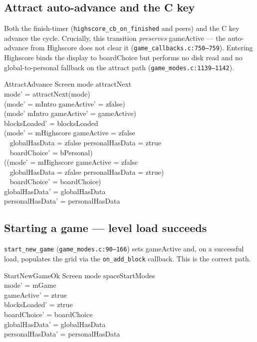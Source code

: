 \documentclass[a4paper,10pt,fleqn]{article}
\begin{document}
\subsection{Attract auto-advance and the C key}

Both the finish-timer (\texttt{highscore\_cb\_on\_finished} and peers)
and the C key advance the cycle.  Crucially, this transition
\emph{preserves} \textsf{gameActive} --- the auto-advance from
\textsf{Highscore} does not clear it (\texttt{game\_callbacks.c:750--759}).
Entering \textsf{Highscore} binds the display to \textsf{boardChoice}
but performs no disk read and no global-to-personal fallback on the
attract path (\texttt{game\_modes.c:1139--1142}).

\begin{schema}{AttractAdvance}
  \Delta Screen
  \where
  mode \in \dom attractNext \\
  mode' = attractNext(mode) \\
  (mode' = mIntro \implies gameActive' = zfalse) \\
  (mode' \neq mIntro \implies gameActive' = gameActive) \\
  blocksLoaded' = blocksLoaded \\
  (mode' = mHighscore \land gameActive = zfalse \\
    \quad~ \land globalHasData = zfalse \land personalHasData = ztrue \\
  \quad~ \implies boardChoice' = bPersonal) \\
  (\lnot (mode' = mHighscore \land gameActive = zfalse \\
    \quad~ \land globalHasData = zfalse \land personalHasData = ztrue) \\
  \quad~ \implies boardChoice' = boardChoice) \\
  globalHasData' = globalHasData \\
  personalHasData' = personalHasData
\end{schema}

\subsection{Starting a game --- level load succeeds}

\texttt{start\_new\_game} (\texttt{game\_modes.c:90--166}) sets
\textsf{gameActive} and, on a successful load, populates the grid via
the \texttt{on\_add\_block} callback.  This is the correct path.

\begin{schema}{StartNewGameOk}
  \Delta Screen
  \where
  mode \in spaceStartModes \\
  mode' = mGame \\
  gameActive' = ztrue \\
  blocksLoaded' = ztrue \\
  boardChoice' = boardChoice \\
  globalHasData' = globalHasData \\
  personalHasData' = personalHasData
\end{schema}
\end{document}
